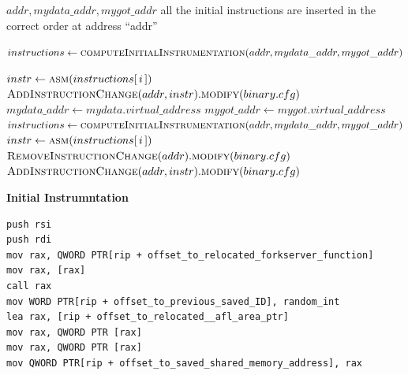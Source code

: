 \begin{algorithm}[ht]
    \caption{Initial Instrumentation algorithm}
    \label{alg:initial_instrumentation}
    \begin{algorithmic}[1]
        \REQUIRE $addr , mydata\_addr , mygot\_addr$ 
        \ENSURE all the initial instructions are inserted in the correct order at address ``addr'' 

        \STATE $instructions \gets \textsc{computeInitialInstrumentation}(addr,mydata\_addr,mygot\_addr)$ 

                \STATE $instr \gets \textsc{asm}(instructions[\,i\,])$ 
                \STATE $\textsc{AddInstructionChange}(addr,instr).\textsc{modify}(binary.cfg)$
                    \STATE $mydata\_addr \gets mydata.virtual\_address$
                    \STATE $mygot\_addr \gets mygot.virtual\_address$
                    \STATE $instructions \gets \textsc{computeInitialInstrumentation}(
                            addr,mydata\_addr,mygot\_addr)$ \COMMENT{\small \textcolor{green!60!black}{recompute all the instructions with the new offset. For the instructions already added GRAPE will takes care of the shift}}
                    \STATE $instr \gets \textsc{asm}(instructions[\,i\,])$
                    \STATE $\textsc{RemoveInstructionChange}(addr).\textsc{modify}(binary.cfg)$ \COMMENT{\small \textcolor{green!60!black}{remove and reinsert the last instruction in order to make sure that the offset to mydata section is correct}}
                    \STATE $\textsc{AddInstructionChange}(addr,instr).\textsc{modify}(binary.cfg)$
                \ENDIF
        \ENDFOR
    \end{algorithmic}
\end{algorithm}
\begin{center}
\textbf{Initial Instrumntation}    
\end{center}
\begin{lstlisting}[caption={Initial Instrumentation},label=lst:init_instr]
push rsi
push rdi
mov rax, QWORD PTR[rip + offset_to_relocated_forkserver_function]
mov rax, [rax]
call rax
mov WORD PTR[rip + offset_to_previous_saved_ID], random_int
lea rax, [rip + offset_to_relocated__afl_area_ptr]
mov rax, QWORD PTR [rax]
mov rax, QWORD PTR [rax]
mov QWORD PTR[rip + offset_to_saved_shared_memory_address], rax
\end{lstlisting}

